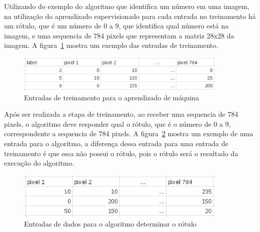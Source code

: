 Utilizando do exemplo do algoritmo que identifica um número em uma imagem,
na utilização do aprendizado supervisionado para cada entrada no treinamento
há um rótulo, que é um número de 0 a 9, que identifica qual número está na
imagem, e uma sequencia de 784 pixels que representam a matriz 28x28 da imagem.
A figura~\ref{fig:tabela_ml_treinamento} mostra um exemplo das entradas de
treinamento.

\begin{figure}[h]
  \centering
  \includegraphics[width=0.9\textwidth]{figuras/tabela_ml_treinamento.eps}
  \caption{Entradas de treinamento para o aprendizado de máquina}
  \label{fig:tabela_ml_treinamento}
\end{figure}

Após ser realizada a etapa de treinamento, ao receber uma sequencia de 784
pixels, o algoritmo deve responder qual o rótulo, que é o número de 0 a 9,
correspondente a sequencia de 784 pixels. A figura~\ref{fig:tabela_ml_entrada}
mostra um exemplo de uma entrada para o algoritmo, a diferença dessa entrada
para uma entrada de treinamento é que essa não possui o rótulo, pois o rótulo
será o resultado da execução do algoritmo.

\begin{figure}[h]
  \centering
  \includegraphics[width=0.9\textwidth]{figuras/tabela_ml_entrada.eps}
  \caption{Entradas de dados para o algoritmo determinar o rótulo}
  \label{fig:tabela_ml_entrada}
\end{figure}
